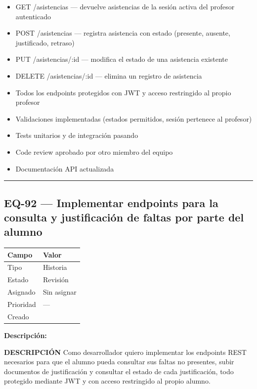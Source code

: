 \documentclass[
  spanish,
  11pt,
]{report}
\newcounter{none} %
\providecommand{\tightlist}{%
  \setlength{\itemsep}{0pt}\setlength{\parskip}{0pt}}
\begin{document}
\begin{itemize}
\tightlist
\item
  GET /asistencias --- devuelve asistencias de la sesión activa del
  profesor autenticado
\item
  POST /asistencias --- registra asistencia con estado (presente,
  ausente, justificado, retraso)
\item
  PUT /asistencias/:id --- modifica el estado de una asistencia
  existente
\item
  DELETE /asistencias/:id --- elimina un registro de asistencia
\item
  Todos los endpoints protegidos con JWT y acceso restringido al propio
  profesor
\item
  Validaciones implementadas (estados permitidos, sesión pertenece al
  profesor)
\item
  Tests unitarios y de integración pasando
\item
  Code review aprobado por otro miembro del equipo
\item
  Documentación API actualizada
\end{itemize}

\begin{center}\rule{0.5\linewidth}{0.5pt}\end{center}

\subsection{EQ-92 --- Implementar endpoints para la consulta y
justificación de faltas por parte del
alumno}\label{eq-92-implementar-endpoints-para-la-consulta-y-justificaciuxf3n-de-faltas-por-parte-del-alumno}

{\def\LTcaptype{none} %
\begin{longtable}[]{@{}ll@{}}
\toprule\noalign{}
Campo & Valor \\
\midrule\noalign{}
\endhead
\bottomrule\noalign{}
\endlastfoot
Tipo & Historia \\
Estado & Revisión \\
Asignado & Sin asignar \\
Prioridad & --- \\
Creado & \\
\end{longtable}
}

\textbf{Descripción:}

\textbf{DESCRIPCIÓN} Como desarrollador quiero implementar los endpoints
REST necesarios para que el alumno pueda consultar sus faltas no
presentes, subir documentos de justificación y consultar el estado de
cada justificación, todo protegido mediante JWT y con acceso restringido
al propio alumno.
\end{document}
